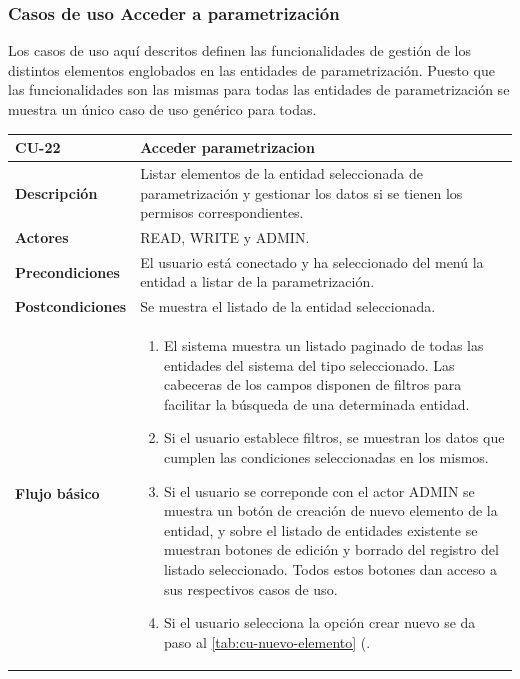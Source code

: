 \subsubsection{Casos de uso Acceder a parametrización} 
\label{sub:cu-parametrizacion}

Los casos de uso aquí descritos definen las funcionalidades de gestión de los distintos elementos englobados en las entidades de parametrización. Puesto que las funcionalidades son las mismas para todas las entidades de parametrización se muestra un único caso de uso genérico para todas. 

\begin{table} [H]
    \centering
    \setlength{\leftmargini}{0.4cm}
	\resizebox{14cm}{!} { %
    \begin{tabular}{| m{3cm} | m{11cm} |}   
    \hline
	  \textbf{CU-22} & \textbf{Acceder parametrizacion} \\\hline
	  \textbf{Descripción} & Listar elementos de la entidad seleccionada de parametrización y gestionar los datos si se tienen los permisos correspondientes. \\\hline
	  \textbf{Actores} & READ, WRITE y ADMIN. \\\hline
	  \textbf{Precondiciones} & El usuario está conectado y ha seleccionado del menú la entidad a listar de la parametrización. \\\hline
	  \textbf{Postcondiciones} & Se muestra el listado de la entidad seleccionada. \\\hline
	  \textbf{Flujo básico} & 
		\begin{enumerate}
	  	\item El sistema muestra un listado paginado de todas las entidades del sistema del tipo seleccionado. Las
cabeceras de los campos disponen de filtros para facilitar la búsqueda de una determinada entidad.
		\item Si el usuario establece filtros, se muestran los datos que cumplen las condiciones seleccionadas en los mismos.
		\item Si el usuario se correponde con el actor ADMIN se muestra un botón de creación de nuevo elemento de la entidad, y sobre el listado de entidades existente se muestran botones de edición y borrado del registro del listado seleccionado. Todos estos botones dan acceso a sus respectivos casos de uso.
		\item Si el usuario selecciona la opción crear nuevo se da paso al \ref{tab:cu-nuevo-elemento} (\pageref{tab:cu-nuevo-elemento}.

\end{enumerate}
\end{tabular}}
\end{table}
